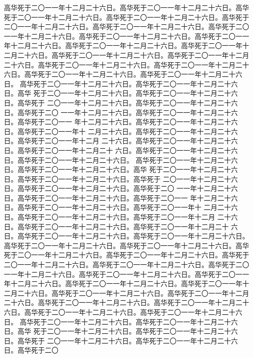 \begin{preface}
	高华死于二〇一一年十二月二十六日。高华死于二〇一一年十二月二十六日。高华
死于二〇一一年十二月二十六日。高华死于二〇一一年十二月二十六日。高华死于
二〇一一年十二月二十六日。高华死于二〇一一年十二月二十六日。高华死于二〇
一一年十二月二十六日。高华死于二〇一一年十二月二十六日。高华死于二〇一一
年十二月二十六日。高华死于二〇一一年十二月二十六日。高华死于二〇一一年十
二月二十六日。高华死于二〇一一年十二月二十六日。高华死于二〇一一年十二月
二十六日。高华死于二〇一一年十二月二十六日。高华死于二〇一一年十二月二十
六日。高华死于二〇一一年十二月二十六日。高华死于二〇一一年十二月二十六日。
高华死于二〇一一年十二月二十六日。高华死于二〇一一年十二月二十六日。高华
死于二〇一一年十二月二十六日。高华死于二〇一一年十二月二十六日。高华死于
二〇一一年十二月二十六日。高华死于二〇一一年十二月二十六日。高华死于二〇
一一年十二月二十六日。高华死于二〇一一年十二月二十六日。高华死于二〇一一
年十二月二十六日。高华死于二〇一一年十二月二十六日。高华死于二〇一一年十
二月二十六日。高华死于二〇一一年十二月二十六日。高华死于二〇一一年十二月
二十六日。高华死于二〇一一年十二月二十六日。高华死于二〇一一年十二月二十
六日。高华死于二〇一一年十二月二十六日。高华死于二〇一一年十二月二十六日。
高华死于二〇一一年十二月二十六日。高华死于二〇一一年十二月二十六日。高华
死于二〇一一年十二月二十六日。高华死于二〇一一年十二月二十六日。高华死于
二〇一一年十二月二十六日。高华死于二〇一一年十二月二十六日。高华死于二〇
一一年十二月二十六日。高华死于二〇一一年十二月二十六日。高华死于二〇一一
年十二月二十六日。高华死于二〇一一年十二月二十六日。高华死于二〇一一年十
二月二十六日。高华死于二〇一一年十二月二十六日。高华死于二〇一一年十二月
二十六日。高华死于二〇一一年十二月二十六日。高华死于二〇一一年十二月二十
六日。高华死于二〇一一年十二月二十六日。高华死于二〇一一年十二月二十六日。
高华死于二〇一一年十二月二十六日。高华死于二〇一一年十二月二十六日。高华
死于二〇一一年十二月二十六日。高华死于二〇一一年十二月二十六日。高华死于
二〇一一年十二月二十六日。高华死于二〇一一年十二月二十六日。高华死于二〇
一一年十二月二十六日。高华死于二〇一一年十二月二十六日。高华死于二〇一一
年十二月二十六日。高华死于二〇一一年十二月二十六日。高华死于二〇一一年十
二月二十六日。高华死于二〇一一年十二月二十六日。高华死于二〇一一年十二月
二十六日。高华死于二〇一一年十二月二十六日。高华死于二〇一一年十二月二十
六日。高华死于二〇一一年十二月二十六日。高华死于二〇一一年十二月二十六日。
高华死于二〇一一年十二月二十六日。高华死于二〇一一年十二月二十六日。高华
死于二〇一一年十二月二十六日。高华死于二〇一一年十二月二十六日。高华死于
二〇一一年十二月二十六日。高华死于二〇一一年十二月二十六日。高华死于二〇

\end{preface}
